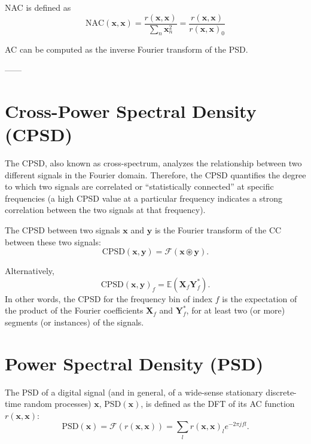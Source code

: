 \gls{NAC} is defined as
\begin{equation}
  {\text{NAC}(\mathbf{x},\mathbf{x})} = \frac{{r(\mathbf{x},\mathbf{x})}}{\sum_n \mathbf{x}_n^2} = \frac{{r(\mathbf{x},\mathbf{x})}}{{r(\mathbf{x},\mathbf{x})}_0}
\end{equation}

\gls{AC} can be computed as the inverse Fourier transform of
the \gls{PSD}.

------


\section{Cross-Power Spectral Density (CPSD)}
\label{sec:CPSD}

The \gls{CPSD}, also known as cross-spectrum, analyzes the
relationship between two different signals in the Fourier domain. Therefore, the \gls{CPSD} quantifies the degree to which two signals
are correlated or ``statistically connected'' at specific
frequencies (a high \gls{CPSD} value at a particular frequency
indicates a strong correlation between the two signals at that
frequency).

The \gls{CPSD} between two signals $\mathbf{x}$ and $\mathbf{y}$ is
the Fourier transform of the \gls{CC} between these two
signals:
\begin{equation}
  \text{CPSD}(\mathbf{x},\mathbf{y})=\mathcal{F}({\mathbf{x}\circledast\mathbf{y}}).
\end{equation}

Alternatively,
\begin{equation}
  \text{CPSD}(\mathbf{x},\mathbf{y})_f = \mathbb{E}(\mathbf{X}_f\mathbf{Y}_f^*).
\end{equation}
In other words, the \gls{CPSD} for the frequency bin of index $f$ is
the expectation of the product of the Fourier coefficients
$\mathbf{X}_f$ and $\mathbf{Y}_f^*$, for at least two (or more)
segments (or instances) of the signals.


\section{Power Spectral Density (PSD)}
\label{sec:PSD}

The \gls{PSD} of a digital signal (and in general, of a wide-sense
stationary discrete-time random processes) $\mathbf{x}$,
$\text{PSD}(\mathbf{x})$, is defined as the \gls{DFT} of its
\gls{AC} function $r(\mathbf{x},\mathbf{x})$:
\begin{equation}
  \text{PSD}(\mathbf{x}) = \mathcal{F}(r(\mathbf{x},\mathbf{x})) = \sum_l r(\mathbf{x},\mathbf{x})_le^{-2\pi jfl}.
\end{equation}

